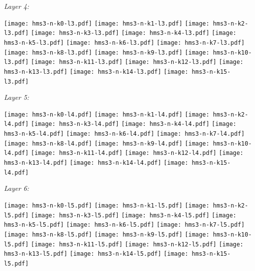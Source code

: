 \documentclass[11pt,a4paper]{article}
\begin{document}
\begin{flushleft}
\bigskip
\emph{Layer 4:}

\texttt{[image: hms3-n-k0-l3.pdf]}
\texttt{[image: hms3-n-k1-l3.pdf]}
\texttt{[image: hms3-n-k2-l3.pdf]}
\texttt{[image: hms3-n-k3-l3.pdf]}
\texttt{[image: hms3-n-k4-l3.pdf]}
\texttt{[image: hms3-n-k5-l3.pdf]}
\texttt{[image: hms3-n-k6-l3.pdf]}
\texttt{[image: hms3-n-k7-l3.pdf]}
\texttt{[image: hms3-n-k8-l3.pdf]}
\texttt{[image: hms3-n-k9-l3.pdf]}
\texttt{[image: hms3-n-k10-l3.pdf]}
\texttt{[image: hms3-n-k11-l3.pdf]}
\texttt{[image: hms3-n-k12-l3.pdf]}
\texttt{[image: hms3-n-k13-l3.pdf]}
\texttt{[image: hms3-n-k14-l3.pdf]}
\texttt{[image: hms3-n-k15-l3.pdf]}

\bigskip
\emph{Layer 5:}

\texttt{[image: hms3-n-k0-l4.pdf]}
\texttt{[image: hms3-n-k1-l4.pdf]}
\texttt{[image: hms3-n-k2-l4.pdf]}
\texttt{[image: hms3-n-k3-l4.pdf]}
\texttt{[image: hms3-n-k4-l4.pdf]}
\texttt{[image: hms3-n-k5-l4.pdf]}
\texttt{[image: hms3-n-k6-l4.pdf]}
\texttt{[image: hms3-n-k7-l4.pdf]}
\texttt{[image: hms3-n-k8-l4.pdf]}
\texttt{[image: hms3-n-k9-l4.pdf]}
\texttt{[image: hms3-n-k10-l4.pdf]}
\texttt{[image: hms3-n-k11-l4.pdf]}
\texttt{[image: hms3-n-k12-l4.pdf]}
\texttt{[image: hms3-n-k13-l4.pdf]}
\texttt{[image: hms3-n-k14-l4.pdf]}
\texttt{[image: hms3-n-k15-l4.pdf]}

\emph{Layer 6:}

\texttt{[image: hms3-n-k0-l5.pdf]}
\texttt{[image: hms3-n-k1-l5.pdf]}
\texttt{[image: hms3-n-k2-l5.pdf]}
\texttt{[image: hms3-n-k3-l5.pdf]}
\texttt{[image: hms3-n-k4-l5.pdf]}
\texttt{[image: hms3-n-k5-l5.pdf]}
\texttt{[image: hms3-n-k6-l5.pdf]}
\texttt{[image: hms3-n-k7-l5.pdf]}
\texttt{[image: hms3-n-k8-l5.pdf]}
\texttt{[image: hms3-n-k9-l5.pdf]}
\texttt{[image: hms3-n-k10-l5.pdf]}
\texttt{[image: hms3-n-k11-l5.pdf]}
\texttt{[image: hms3-n-k12-l5.pdf]}
\texttt{[image: hms3-n-k13-l5.pdf]}
\texttt{[image: hms3-n-k14-l5.pdf]}
\texttt{[image: hms3-n-k15-l5.pdf]}

\end{flushleft}






%
%
\end{document}
